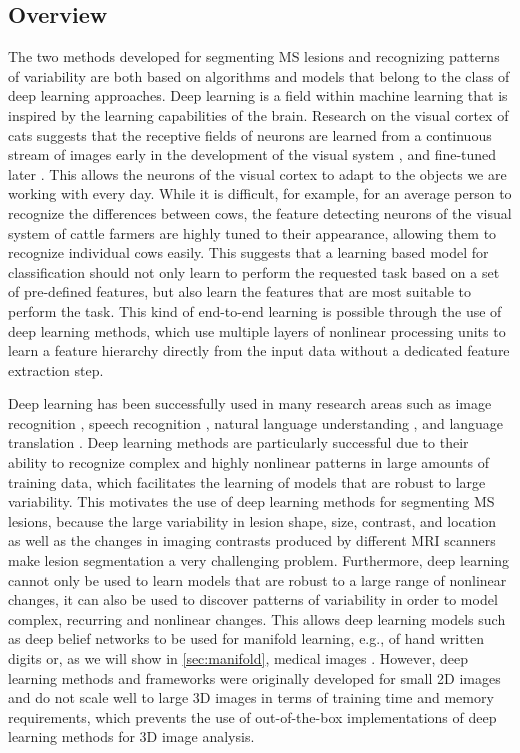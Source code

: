 \subsection{Overview}

The two methods developed for segmenting MS lesions and recognizing patterns of
variability are both based on algorithms and models that belong to the class of
deep learning approaches. Deep learning is a field within machine learning that
is inspired by the learning capabilities of the brain. Research on the visual
cortex of cats suggests that the receptive fields of neurons are learned from a
continuous stream of images early in the development of the visual system
\citep{wiesel1963}, and fine-tuned later \citep{karni1991}. This allows the
neurons of the visual cortex to adapt to the objects we are working with every
day. While it is difficult, for example, for an average person to recognize the
differences between cows, the feature detecting neurons of the visual system of
cattle farmers are highly tuned to their appearance, allowing them to recognize
individual cows easily. This suggests that a learning based model for
classification should not only learn to perform the requested task based on a
set of pre-defined features, but also learn the features that are most
suitable to perform the task. This kind of end-to-end learning is possible
through the use of deep learning methods, which use multiple layers of nonlinear
processing units to learn a feature hierarchy directly from the input data
without a dedicated feature extraction step.

Deep learning has been successfully used in many research areas such as image
recognition \citep{krizhevsky2012}, speech recognition \citep{hinton2012deep},
natural language understanding \citep{collobert2011natural}, and language
translation \citep{sutskever2014sequence}. Deep learning methods are
particularly successful due to their ability to recognize complex and highly
nonlinear patterns in large amounts of training data, which facilitates the
learning of models that are robust to large variability. This motivates the use
of deep learning methods for segmenting MS lesions, because the large
variability in lesion shape, size, contrast, and location as well as the changes
in imaging contrasts produced by different MRI scanners make lesion segmentation
a very challenging problem. Furthermore, deep learning cannot only be used
to learn models that are robust to a large range of nonlinear changes, it can
also be used to discover patterns of variability in order to model complex,
recurring and nonlinear changes. This allows deep learning models such as deep
belief networks to be used for manifold learning, e.g., of hand written digits
\citep{hinton2006b} or, as we will show in \ref{sec:manifold}, medical images
\citep{brosch2013}. However, deep learning methods and frameworks
were originally developed for small 2D images and do not scale well to large 3D
images in terms of training time and memory requirements, which prevents the use
of out-of-the-box implementations of deep learning methods for 3D image
analysis.

